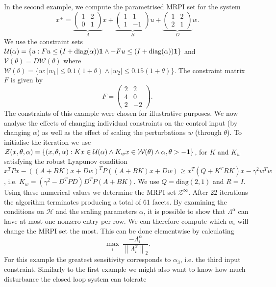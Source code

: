 \documentclass[letterpaper, 10pt, conference]{ieeeconf} %
\providecommand{\norm}[1]{\left\|#1\right\|}
\providecommand{\abs}[1]{\left|#1\right|}
\begin{document}
In the second example, we compute the parametrised MRPI set for the system
%
$$
x^+ = \underbrace{\left(\begin{array}{cc}1 & 2 \\ 0 & 1\end{array}\right)}_Ax + 
\underbrace{\left(\begin{array}{cc} 1 & 1 \\ 1 & -1\end{array}\right)}_B u + 
\underbrace{\left(\begin{array}{cc} 1 & 2 \\ 2 & 1 \end{array}\right)}_D w.
$$
%
We use the constraint sets $\mathcal U(\alpha) = \{u: Fu\leq(I+\text{diag}(\alpha)){\bf{1}} \wedge
-Fu\leq (I+\text{diag}(\alpha)){\bf{1}}\}$ and $\mathcal V(\theta) = D\mathcal W(\theta)$ where $\mathcal W(\theta) = \{w:
\abs{w_1}\leq 0.1(1+\theta)\wedge \abs{w_2}\leq 0.15(1+\theta)\}$. The constraint matrix $F$ is given by
%
$$
	F = \left(\begin{array}{cc} 2 & 2 \\ 4 & 0 \\ 2 & -2 \end{array}\right).
$$
%
The constraints of this example were chosen for  illustrative purposes.
We now analyse the effects of changing individual constraints on the control input (by changing $\alpha$) as well as the
effect of scaling the perturbations $w$ (through $\theta$). To initialise the iteration we use
$\mathcal Z(x,\theta,\alpha) = \left\{(x,\theta,\alpha): Kx\in\mathcal U(\alpha)\wedge K_w x\in\mathcal W
(\theta)\wedge \alpha,\theta>-{\bf{1}}\right\}$, for $K$ and $K_w$ satisfying the robust Lyapunov condition
$x^TPx - ((A+BK)x+Dw)^TP((A+BK)x+Dw)\geq x^T(Q+K^TRK)x -\gamma^2 w^Tw$, i.e. $K_w = (\gamma^2-D^TPD)D^TP(A+BK)$.
We use $Q = \text{diag}(2,1)$ and $R = I$. Using these numerical values we determine the MRPI set 
$\mathcal Z^\infty$. After 22 iterations the algorithm terminates producing a total of 61 facets. 
By examining the conditions on $\mathcal H$ and the scaling parameters $\alpha$, it is possible to show that 
$\Lambda^\alpha$ can have at 
most one nonzero entry per row. We can therefore 
compute which $\alpha_i$ will change the MRPI set the most. This can be done elementwise by calculating
%
$$
	\max_i \  \frac{-\Lambda_i^\alpha}{\norm{\Lambda_i^x}_2}.
$$
%
For this example the greatest sensitivity corresponds to $\alpha_3$, 
i.e. the third input constraint.
Similarly to the first example we might also want to know how much disturbance the closed loop system can tolerate 
\end{document}
